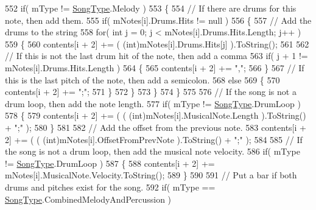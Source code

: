 \begin{DoxyCodeInclude}
552             \textcolor{keywordflow}{if}( mType != \hyperlink{group___song_enums_gae681a1f001333e39fc1cb4fea97bfe1b}{SongType}.Melody )
553             \{
554                 \textcolor{comment}{// If there are drums for this note, then add them. }
555                 \textcolor{keywordflow}{if}( mNotes[i].Drums.Hits != null )
556                 \{
557                     \textcolor{comment}{// Add the drums to the string}
558                     \textcolor{keywordflow}{for}( \textcolor{keywordtype}{int} j = 0; j < mNotes[i].Drums.Hits.Length; j++ )
559                     \{
560                         contents[i + 2] += ( (int)mNotes[i].Drums.Hits[j] ).ToString();
561 
562                         \textcolor{comment}{// If this is not the last drum hit of the note, then add a comma}
563                         \textcolor{keywordflow}{if}( j + 1 != mNotes[i].Drums.Hits.Length )
564                         \{
565                             contents[i + 2] += \textcolor{stringliteral}{","};
566                         \}
567                         \textcolor{comment}{// If this is the last pitch of the note, then add a semicolon.}
568                         \textcolor{keywordflow}{else}
569                         \{
570                             contents[i + 2] += \textcolor{stringliteral}{";"};
571                         \}
572                     \}
573                 \}
574             \}
575 
576             \textcolor{comment}{// If the song is not a drum loop, then add the note length.}
577             \textcolor{keywordflow}{if}( mType != \hyperlink{group___song_enums_gae681a1f001333e39fc1cb4fea97bfe1b}{SongType}.DrumLoop )
578             \{
579                 contents[i + 2] += ( ( (int)mNotes[i].MusicalNote.Length ).ToString() + \textcolor{stringliteral}{";"} );
580             \}
581 
582             \textcolor{comment}{// Add the offset from the previous note.}
583             contents[i + 2] += ( ( (int)mNotes[i].OffsetFromPrevNote ).ToString() + \textcolor{stringliteral}{";"} );
584 
585             \textcolor{comment}{// If the song is not a drum loop, then add the musical note velocity.}
586             \textcolor{keywordflow}{if}( mType != \hyperlink{group___song_enums_gae681a1f001333e39fc1cb4fea97bfe1b}{SongType}.DrumLoop )
587             \{
588                 contents[i + 2] += mNotes[i].MusicalNote.Velocity.ToString();
589             \}
590 
591             \textcolor{comment}{// Put a bar if both drums and pitches exist for the song.}
592             \textcolor{keywordflow}{if}( mType == \hyperlink{group___song_enums_gae681a1f001333e39fc1cb4fea97bfe1b}{SongType}.CombinedMelodyAndPercussion )

\end{DoxyCodeInclude}
